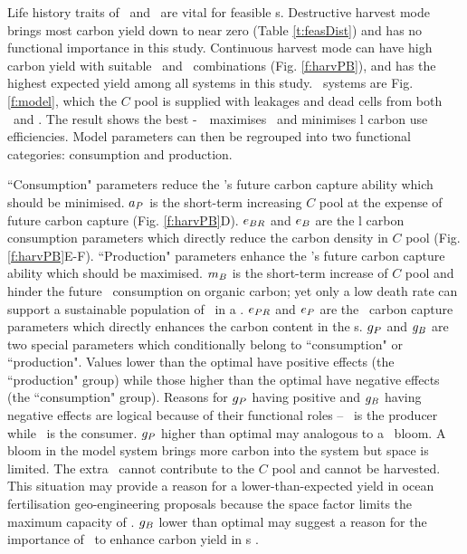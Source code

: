 \documentclass[../thesis.tex]{subfiles} %
\begin{document}
Life history traits of \phy\ and \bac\ are vital for feasible \pbs s.  Destructive harvest mode brings most carbon yield down to near zero (Table \ref{t:feasDist}) and has no functional importance in this study.  Continuous harvest mode can have high carbon yield with suitable \phy\ and \bac\ combinations (Fig. \ref{f:harvPB}), and has the highest expected yield among all systems in this study.  \PBH\ systems are Fig. \ref{f:model}, which the $C$ pool is supplied with leakages and dead cells from both \phy\ and \bac.  The result shows the best \phy-\bac\ \pbs\ maximises \phy\ and minimises \bac l carbon use efficiencies.  Model parameters can then be regrouped into two functional categories: consumption and production.

``Consumption" parameters reduce the \pbs's future carbon capture ability which should be minimised.  $a_P$ is the short-term increasing $C$ pool at the expense of future carbon capture (Fig. \ref{f:harvPB}D).  $e_{BR}$ and $e_B$ are the \bac l carbon consumption parameters which directly reduce the carbon density in $C$ pool (Fig. \ref{f:harvPB}E-F).  ``Production" parameters enhance the \pbs's future carbon capture ability which should be maximised.  $m_B$ is the short-term increase of $C$ pool and hinder the future \bac\ consumption on organic carbon; yet only a low death rate can support a sustainable population of \bac\ in a \pbs. $e_{PR}$ and $e_P$ are the \phy\ carbon capture parameters which directly enhances the carbon content in the \pbs s.  $g_P$ and $g_B$ are two special parameters which conditionally belong to ``consumption" or ``production".  Values lower than the optimal have positive effects (the ``production" group) while those higher than the optimal have negative effects (the ``consumption" group).  Reasons for $g_P$ having positive and $g_B$ having negative effects are logical because of their functional roles -- \phy\ is the producer while \bac\ is the consumer.  $g_P$ higher than optimal may analogous to a \phy\ bloom.  A bloom in the model system brings more carbon into the system but space is limited.  The extra \phy\ cannot contribute to the $C$ pool and cannot be harvested.  This situation may provide a reason for a lower-than-expected yield in ocean fertilisation geo-engineering proposals \autocite{boyd2008implications,gnanadesikan2008export,oschlies2010side} because the space factor limits the maximum capacity of \phy.  $g_B$ lower than optimal may suggest a reason for the importance of \bac\ to enhance carbon yield in \pbs s \autocite{fuentes2016impact,santos2014microalgal}.
\end{document}
